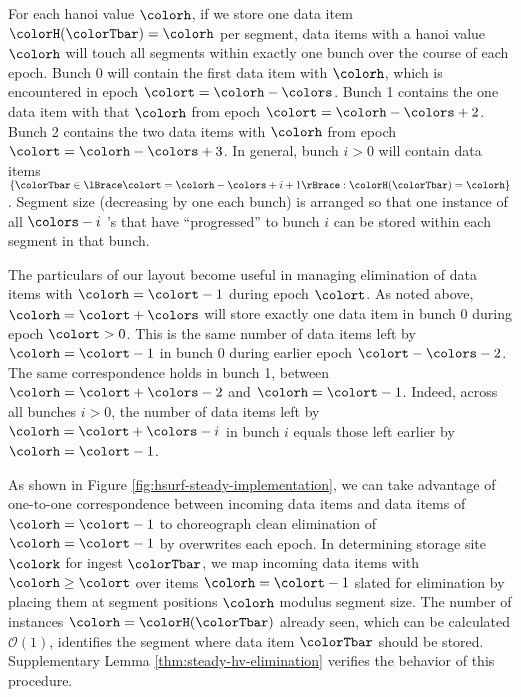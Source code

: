 For each hanoi value $\colorh$, if we store one data item $\colorH(\colorTbar) = \colorh$ per segment, data items with a hanoi value $\colorh$ will touch all segments within exactly one bunch over the course of each epoch.
Bunch 0 will contain the first data item with \hv{} $\colorh$, which is encountered in epoch $\colort=\colorh - \colors$.
Bunch 1 contains the one data item with that \hv{} $\colorh$ from epoch $\colort=\colorh - \colors + 2$.
Bunch 2 contains the two data items with \hv{} $\colorh$ from epoch $\colort=\colorh - \colors + 3$.
In general, bunch $i>0$ will contain data items $\{ \colorTbar \in \lBrace \colort = \colorh - \colors + i + 1 \rBrace : \colorH(\colorTbar) = \colorh \}$.
Segment size (decreasing by one each bunch) is arranged so that one instance of all $\colors - i$ \hv's that have ``progressed'' to bunch $i$ can be stored within each segment in that bunch.



The particulars of our layout become useful in managing elimination of data items with \hv{} $\colorh = \colort - 1$ during epoch $\colort$.
As noted above, \hv{} $\colorh = \colort + \colors$ will store exactly one data item in bunch 0 during epoch $\colort > 0$.
This is the same number of data items left by \hv{} $\colorh = \colort - 1$ in bunch 0 during earlier epoch $\colort - \colors - 2$.
The same correspondence holds in bunch 1, between \hv{} $\colorh = \colort + \colors - 2$ and \hv{} $\colorh = \colort - 1$.
Indeed, across all bunches $i>0$, the number of data items left by \hv{} $\colorh = \colort + \colors - i$ in bunch $i$ equals those left earlier by \hv{} $\colorh = \colort - 1$.

As shown in Figure \ref{fig:hsurf-steady-implementation}, we can take advantage of one-to-one correspondence between incoming data items and data items of \hv{} $\colorh=\colort-1$ to choreograph clean elimination of \hv{} $\colorh=\colort-1$ by overwrites each epoch.
In determining storage site $\colork$ for ingest $\colorTbar$, we map incoming data items with \hv{} $\colorh \geq \colort$ over items $\colorh = \colort - 1$ slated for elimination by placing them at segment positions $\colorh$ modulus segment size.
The number of \hv{} instances $\colorh = \colorH(\colorTbar)$ already seen, which can be calculated $\mathcal{O}(1)$, identifies the segment where data item $\colorTbar$ should be stored.
Supplementary Lemma \ref{thm:steady-hv-elimination} verifies the behavior of this procedure.

